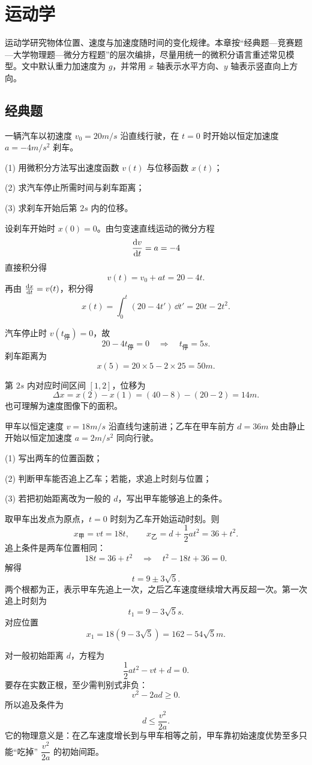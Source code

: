 \chapter{运动学}

运动学研究物体位置、速度与加速度随时间的变化规律。本章按“经典题—竞赛题—大学物理题—微分方程题”的层次编排，尽量用统一的微积分语言重述常见模型。文中默认重力加速度为 $g$，并常用 $x$ 轴表示水平方向、$y$ 轴表示竖直向上方向。

\section*{经典题}

\begin{classic}
一辆汽车以初速度 $v_0=20\unit{m/s}$ 沿直线行驶，在 $t=0$ 时开始以恒定加速度 $a=-4\unit{m/s^2}$ 刹车。

(1) 用微积分方法写出速度函数 $v(t)$ 与位移函数 $x(t)$；

(2) 求汽车停止所需时间与刹车距离；

(3) 求刹车开始后第 $2\unit{s}$ 内的位移。

\begin{solution}
设刹车开始时 $x(0)=0$。由匀变速直线运动的微分方程
\[
\dv{v}{t}=a=-4
\]
直接积分得
\[
v(t)=v_0+at=20-4t.
\]
再由 $\dv{x}{t}=v(t)$，积分得
\[
x(t)=\int_0^t (20-4t')\,\dd t'=20t-2t^2.
\]

汽车停止时 $v(t_\text{停})=0$，故
\[
20-4t_\text{停}=0\quad\Rightarrow\quad t_\text{停}=5\unit{s}.
\]
刹车距离为
\[
x(5)=20\times 5-2\times 25=50\unit{m}.
\]

第 $2\unit{s}$ 内对应时间区间 $[1,2]$，位移为
\[
\Delta x=x(2)-x(1)=(40-8)-(20-2)=14\unit{m}.
\]
也可理解为速度图像下的面积。
\end{solution}
\end{classic}

\begin{classic}
甲车以恒定速度 $v=18\unit{m/s}$ 沿直线匀速前进；乙车在甲车前方 $d=36\unit{m}$ 处由静止开始以恒定加速度 $a=2\unit{m/s^2}$ 同向行驶。

(1) 写出两车的位置函数；

(2) 判断甲车能否追上乙车；若能，求追上时刻与位置；

(3) 若把初始距离改为一般的 $d$，写出甲车能够追上的条件。

\begin{solution}
取甲车出发点为原点，$t=0$ 时刻为乙车开始运动时刻。则
\[
x_\text{甲}=vt=18t,
\qquad
x_\text{乙}=d+\frac12 at^2=36+t^2.
\]
追上条件是两车位置相同：
\[
18t=36+t^2 \quad\Rightarrow\quad t^2-18t+36=0.
\]
解得
\[
t=9\pm 3\sqrt5.
\]
两个根都为正，表示甲车先追上一次，之后乙车速度继续增大再反超一次。第一次追上时刻为
\[
t_1=9-3\sqrt5\unit{s}.
\]
对应位置
\[
x_1=18(9-3\sqrt5)=162-54\sqrt5\unit{m}.
\]

对一般初始距离 $d$，方程为
\[
\frac12 at^2-vt+d=0.
\]
要存在实数正根，至少需判别式非负：
\[
v^2-2ad\ge 0.
\]
所以追及条件为
\[
d\le \frac{v^2}{2a}.
\]
它的物理意义是：在乙车速度增长到与甲车相等之前，甲车靠初始速度优势至多只能“吃掉” $\dfrac{v^2}{2a}$ 的初始间距。
\end{solution}
\end{classic}


